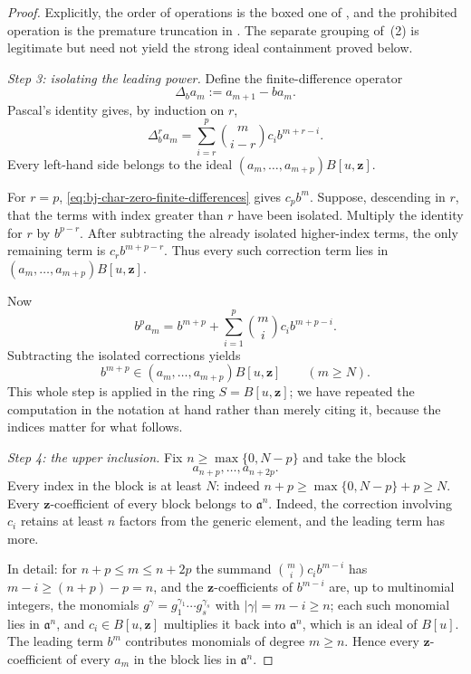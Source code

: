 \begin{proof}
Explicitly, the order of operations is the boxed one of
, and the prohibited operation is the premature truncation in
.
The separate grouping of \,(2) is
legitimate but need not yield the strong ideal containment proved below.

\emph{Step 3: isolating the leading power.}
Define the finite-difference operator
\[
                         \Delta_ba_m:=a_{m+1}-ba_m.
\]
Pascal's identity gives, by induction on $r$,
\[
 \Delta_b^r a_m
       =\sum_{i=r}^p\binom m{i-r}c_i b^{m+r-i}.
\tag{44.7}\label{eq:bj-char-zero-finite-differences}
\]
Every left-hand side belongs to the ideal
$(a_m,\ldots,a_{m+p})B[u,\mathbf z]$.

For $r=p$, \eqref{eq:bj-char-zero-finite-differences} gives $c_pb^m$.
Suppose, descending in $r$, that the terms with index greater than $r$
have been isolated.
Multiply the identity for $r$ by $b^{p-r}$.
After subtracting the already isolated higher-index terms, the only remaining
term is $c_rb^{m+p-r}$.
Thus every such correction term lies in
$(a_m,\ldots,a_{m+p})B[u,\mathbf z]$.

Now
\[
 b^pa_m=b^{m+p}
       +\sum_{i=1}^p\binom mi c_i b^{m+p-i}.
\]
Subtracting the isolated corrections yields
\[
 b^{m+p}\in(a_m,\ldots,a_{m+p})B[u,\mathbf z]
                         \qquad(m\ge N).
\tag{44.8}\label{eq:bj-char-zero-leading-power}
\]
This whole step is  applied in the ring
$S=B[u,\mathbf z]$; we have repeated the computation in the notation at
hand rather than merely citing it, because the indices matter for what
follows.

\emph{Step 4: the upper inclusion.}
Fix $n\ge\max\{0,N-p\}$ and take the block
\[
                         a_{n+p},\ldots,a_{n+2p}.
\]
Every index in the block is at least $N$: indeed
$n+p\ge\max\{0,N-p\}+p\ge N$.
Every $\mathbf z$-coefficient of every block belongs to
$\mathfrak a^n$.
Indeed, the correction involving $c_i$ retains at least $n$ factors from
the generic element, and the leading term has more.

In detail: for $n+p\le m\le n+2p$ the summand $\binom mic_ib^{m-i}$
has $m-i\ge(n+p)-p=n$, and the $\mathbf z$-coefficients of $b^{m-i}$
are, up to multinomial integers, the monomials
$g^\gamma=g_1^{\gamma_1}\cdots g_s^{\gamma_s}$ with
$|\gamma|=m-i\ge n$; each such monomial lies in $\mathfrak a^n$, and
$c_i\in B[u,\mathbf z]$ multiplies it back into $\mathfrak a^n$, which is an
ideal of $B[u]$.  The leading term $b^m$ contributes monomials of degree
$m\ge n$.  Hence every $\mathbf z$-coefficient of every $a_m$ in the
block lies in $\mathfrak a^n$.


\end{proof}
